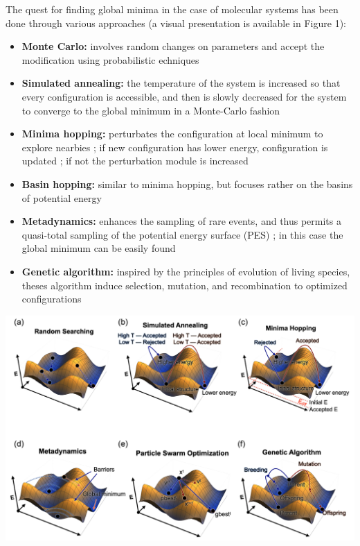\documentclass[11pt]{article}
\begin{document}
\begin{multicols}{2}
\noindent The quest for finding global minima in the case of molecular systems has been done through various approaches (a visual presentation is available in Figure 1):
\begin{itemize}
    \itemsep0em
    \item \textbf{Monte Carlo:} involves random changes on parameters and accept the modification using probabilistic echniques \cite{PhysRevB.95.144104}
    \item \textbf{Simulated annealing:} the temperature of the system is increased so that every configuration is accessible, and then is slowly decreased for the system to converge to the global minimum in a Monte-Carlo fashion
    \item \textbf{Minima hopping:} perturbates the configuration at local minimum to explore nearbies ; if new configuration has lower energy, configuration is updated ; if not the perturbation module is increased
    \item \textbf{Basin hopping:} similar to minima hopping, but focuses rather on the basins of potential energy
    \item \textbf{Metadynamics:} enhances the sampling of rare events, and thus permits a quasi-total sampling of the potential energy surface (PES) ; in this case the global minimum can be easily found
    \item \textbf{Genetic algorithm:} inspired by the principles of evolution of living species, theses algorithm induce selection, mutation, and recombination to optimized configurations
\end{itemize}
\bigskip

              \noindent \includegraphics[width=\columnwidth]{figures/optim_figures.png}
                \medskip


\end{multicols}
\end{document}
